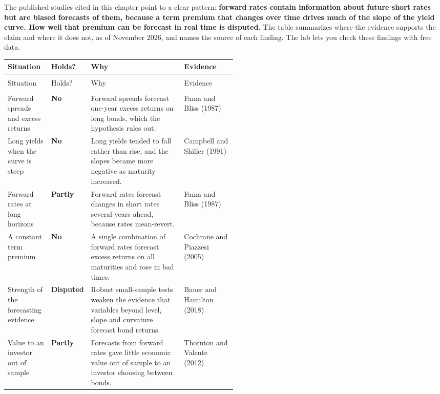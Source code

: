 The published studies cited in this chapter point to a clear pattern: \textbf{forward rates contain information about future short rates but are biased forecasts of them, because a term premium that changes over time drives much of the slope of the yield curve. How well that premium can be forecast in real time is disputed.} The table summarizes where the evidence supports the claim and where it does not, as of November 2026, and names the source of each finding. The lab lets you check these findings with free data.

{\small
\begin{longtable}{@{}>{\raggedright\arraybackslash}p{0.19\linewidth}>{\raggedright\arraybackslash}p{0.10\linewidth}>{\raggedright\arraybackslash}p{}>{\raggedright\arraybackslash}p{0.23\linewidth}@{}}
\toprule
Situation & Holds? & Why & Evidence \\
\midrule
\endfirsthead
\multicolumn{4}{@{}l}{\emph{(continued)}} \\
\toprule
Situation & Holds? & Why & Evidence \\
\midrule
\endhead
\midrule
\multicolumn{4}{r@{}}{\emph{(continued on the next page)}} \\
\endfoot
\bottomrule
\endlastfoot
Forward spreads and excess returns & \textbf{No} & Forward spreads forecast one-year excess returns on long bonds, which the hypothesis rules out. & Fama and Bliss (1987) \\
\addlinespace[3pt]
Long yields when the curve is steep & \textbf{No} & Long yields tended to fall rather than rise, and the slopes became more negative as maturity increased. & Campbell and Shiller (1991) \\
\addlinespace[3pt]
Forward rates at long horizons & \textbf{Partly} & Forward rates forecast changes in short rates several years ahead, because rates mean-revert. & Fama and Bliss (1987) \\
\addlinespace[3pt]
A constant term premium & \textbf{No} & A single combination of forward rates forecast excess returns on all maturities and rose in bad times. & Cochrane and Piazzesi (2005) \\
\addlinespace[3pt]
Strength of the forecasting evidence & \textbf{Disputed} & Robust small-sample tests weaken the evidence that variables beyond level, slope and curvature forecast bond returns. & Bauer and Hamilton (2018) \\
\addlinespace[3pt]
Value to an investor out of sample & \textbf{Partly} & Forecasts from forward rates gave little economic value out of sample to an investor choosing between bonds. & Thornton and Valente (2012) \\
\end{longtable}
}

